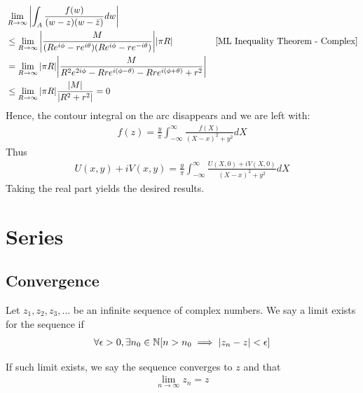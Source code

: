 \documentclass[12pt, english]{book}
\makeatletter
\renewenvironment{proof}[1][\proofname]{\par
	\pushQED{\qed}%
	\normalfont \topsep6\p@\@plus6\p@\relax
	\list{}{%
		\settowidth{\leftmargin}{\itshape\proofname:\hskip\labelsep}%
		\setlength{\labelwidth}{0pt}%
		\setlength{\itemindent}{-\leftmargin}%
	}%
	\item[\hskip\labelsep\itshape#1\@addpunct{:}]\ignorespaces
	}{ \popQED\endlist\@endpefalse}
\makeatother
\begin{document}
\begin{proof}
{\begin{align*}
			&\lim_{R \rightarrow \infty}
			 \abs{\int_{A} \frac{f(w)}{(w-z)(w-\bar{z})} dw}  \\
			&\leq\lim_{R \rightarrow \infty} 
			 \abs{\frac{M}{(Re^{i\phi} - re^{i\theta})(Re^{i\phi} - re^{-i\theta})}} \abs{\pi R} & \Cref{ML Inequality Theorem - Complex} \\
			&= \lim_{R \rightarrow \infty} \abs{\pi R} 
			   \abs{\frac{M}{R^2 e^{2i\phi} - Rre^{i(\phi - \theta)} - Rre^{i(\phi + \theta)} + r^2}} \\
			&\leq \lim_{R \rightarrow \infty} \abs{\pi R} \frac{\abs{M}}{\abs{R^2 + r^2}}
			= 0 
		\end{align*}
		}
		Hence, the contour integral on the arc disappears and we are left with:
		\begin{align*}
			f(z)  = \frac{y}{\pi} \int_{-\infty}^{\infty} \frac{f(X)}{(X-x)^2 + y^2} dX
		\end{align*}
		Thus
		\begin{align*}
			U(x,y) + iV(x,y) = \frac{y}{\pi} \int_{-\infty}^{\infty} \frac{U(X, 0) + iV(X,0)}{(X-x)^2 + y^2} dX
		\end{align*}
		Taking the real part yields the desired results.
	\end{proof}

	\chapter{Series} \label{Series Chapter - Complex}
	
	\section{Convergence} \label{Convergence Section - Complex}
	
	\begin{definition}
		Let \(z_1, z_2, z_3, \ldots \) be an infinite sequence of complex numbers. We say a limit exists for the sequence if
		\begin{align*}
			\forall \epsilon > 0, \exists n_0 \in \mathbb{N}
			[n > n_0 \implies \abs{z_n - z} < \epsilon]
		\end{align*}
	\end{definition}
	
	\begin{definition}
		If such limit exists, we say the sequence converges to \(z\) and that 
		\begin{align*}
			\lim_{n \rightarrow \infty} z_n = z
		\end{align*}
	\end{definition}
	
\end{document}
